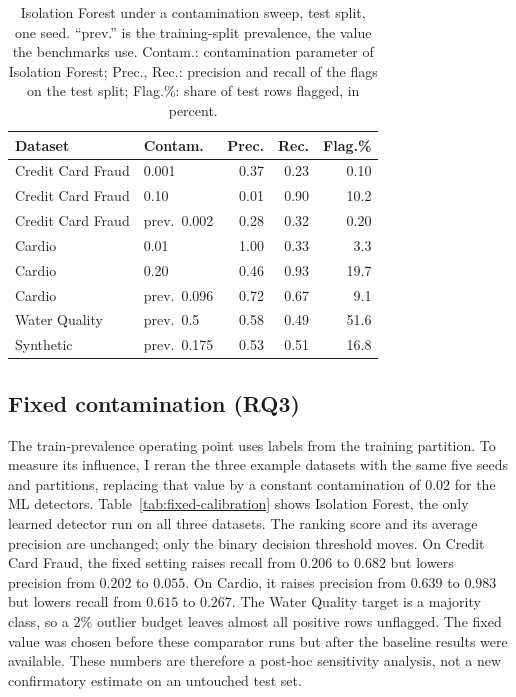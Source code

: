 \documentclass[conference]{IEEEtran}
\begin{document}
\begin{table}[t]
\caption{Isolation Forest under a contamination sweep, test split, one
seed. ``prev.'' is the training-split prevalence, the value the
benchmarks use. Contam.: contamination parameter of Isolation Forest; Prec., Rec.: precision and
recall of the flags on the test split; Flag.\%: share of test rows flagged, in percent.}
\label{tab:contamination}
\centering
\setlength{\tabcolsep}{4pt}
\footnotesize
\begin{tabular}{llrrr}
\toprule
Dataset & Contam. & Prec. & Rec. & Flag.\% \\
\midrule
Credit Card Fraud & 0.001 & 0.37 & 0.23 & 0.10 \\
Credit Card Fraud & 0.10 & 0.01 & 0.90 & 10.2 \\
Credit Card Fraud & prev.\ 0.002 & 0.28 & 0.32 & 0.20 \\
\midrule
Cardio            & 0.01 & 1.00 & 0.33 & 3.3 \\
Cardio            & 0.20 & 0.46 & 0.93 & 19.7 \\
Cardio            & prev.\ 0.096 & 0.72 & 0.67 & 9.1 \\
\midrule
Water Quality     & prev.\ 0.5 & 0.58 & 0.49 & 51.6 \\
Synthetic         & prev.\ 0.175 & 0.53 & 0.51 & 16.8 \\
\bottomrule
\end{tabular}
\end{table}

\subsection{Fixed contamination (RQ3)}
The train-prevalence operating point uses labels from the training
partition. To measure its influence, I reran the three example datasets
with the same five seeds and partitions, replacing that value by a
constant contamination of $0.02$ for the ML detectors. Table~\ref{tab:fixed-calibration}
shows Isolation Forest, the only learned detector run on all three
datasets. The ranking score and its average precision are unchanged;
only the binary decision threshold moves. On Credit Card Fraud, the
fixed setting raises recall from $0.206$ to $0.682$ but lowers precision
from $0.202$ to $0.055$. On Cardio, it raises precision from $0.639$ to
$0.983$ but lowers recall from $0.615$ to $0.267$. The Water Quality
target is a majority class, so a $2\%$ outlier budget leaves almost all
positive rows unflagged. The fixed value was chosen before these
comparator runs but after the baseline results were available. These
numbers are therefore a post-hoc sensitivity analysis, not a new
confirmatory estimate on an untouched test set.
\end{document}
